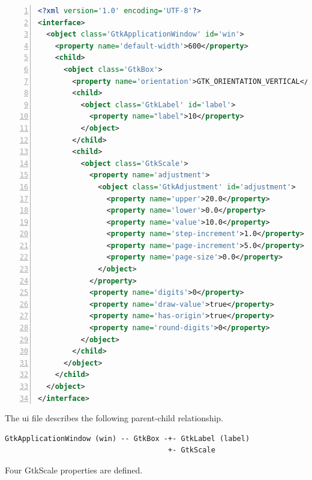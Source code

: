 \begin{lstlisting}[language=XML, numbers=left]
<?xml version='1.0' encoding='UTF-8'?>
<interface>
  <object class='GtkApplicationWindow' id='win'>
    <property name='default-width'>600</property>
    <child>
      <object class='GtkBox'>
        <property name='orientation'>GTK_ORIENTATION_VERTICAL</property>
        <child>
          <object class='GtkLabel' id='label'>
            <property name="label">10</property>
          </object>
        </child>
        <child>
          <object class='GtkScale'>
            <property name='adjustment'>
              <object class='GtkAdjustment' id='adjustment'>
                <property name='upper'>20.0</property>
                <property name='lower'>0.0</property>
                <property name='value'>10.0</property>
                <property name='step-increment'>1.0</property>
                <property name='page-increment'>5.0</property>
                <property name='page-size'>0.0</property>
              </object>
            </property>
            <property name='digits'>0</property>
            <property name='draw-value'>true</property>
            <property name='has-origin'>true</property>
            <property name='round-digits'>0</property>
          </object>
        </child>
      </object>
    </child>
  </object>
</interface>
\end{lstlisting}

The ui file describes the following parent-child relationship.

\begin{lstlisting}
GtkApplicationWindow (win) -- GtkBox -+- GtkLabel (label)
                                      +- GtkScale
\end{lstlisting}

Four GtkScale properties are defined.

